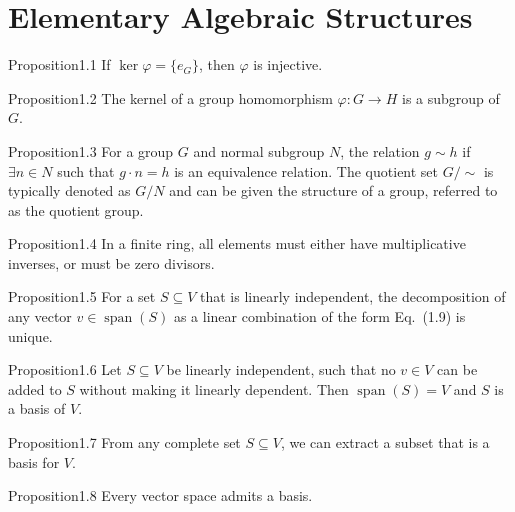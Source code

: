 \section{Elementary Algebraic Structures}

\begin{res}{Proposition}{1.1}
If $\ker\varphi=\{e_G\}$, then $\varphi$ is injective.
\end{res}

\begin{res}{Proposition}{1.2}
The kernel of a group homomorphism $\varphi:G\to H$ is a subgroup of $G$.
\end{res}

\begin{res}{Proposition}{1.3}
For a group $G$ and normal subgroup $N$, the relation $g\sim h$ if $\exists n\in N$ such that $g\cdot n=h$ is an equivalence relation. The quotient set $G/\!\sim$ is typically denoted as $G/N$ and can be given the structure of a group, referred to as the quotient group.
\end{res}

\begin{res}{Proposition}{1.4}
In a finite ring, all elements must either have multiplicative inverses, or must be zero divisors.
\end{res}

\begin{res}{Proposition}{1.5}
For a set $S\subseteq V$ that is linearly independent, the decomposition of any vector $v\in\operatorname{span}(S)$ as a linear combination of the form Eq.~(1.9) is unique.
\end{res}

\begin{res}{Proposition}{1.6}
Let $S\subseteq V$ be linearly independent, such that no $v\in V$ can be added to $S$ without making it linearly dependent. Then $\operatorname{span}(S)=V$ and $S$ is a basis of $V$.
\end{res}

\begin{res}{Proposition}{1.7}
From any complete set $S\subseteq V$, we can extract a subset that is a basis for $V$.
\end{res}

\begin{res}{Proposition}{1.8}
Every vector space admits a basis.
\end{res}

